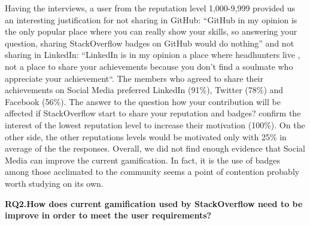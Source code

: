 \documentclass{sigchi}
\begin{document}
Having the interviews, a user from the reputation level 1,000-9,999 provided us an interesting justification for not sharing in GitHub: “GitHub in my opinion is the only popular place where you can really show your skills, so answering your question, sharing StackOverflow badges on GitHub would do nothing” and not sharing in LinkedIn: “LinkedIn is in my opinion a place where headhunters live , not a place to share your achievements because you don’t find a soulmate who appreciate your achievement“. The members who agreed to share their achievements on Social Media preferred LinkedIn (91\%), Twitter (78\%) and Facebook (56\%). The answer to the question how your contribution will be affected if StackOverflow start to share your reputation and badges? confirm the interest of the lowest reputation level to increase their motivation (100\%). On the other side, the other reputations levels would be motivated only with 25\% in average of the the responses. Overall, we did not find enough evidence that Social Media can improve the current gamification. In fact, it is the use of badges among those acclimated to the community seems a point of contention probably worth studying on its own. 

\textbf{RQ2.How does current gamification used by StackOverflow need to be improve in order to meet the user requirements?}
\end{document}
